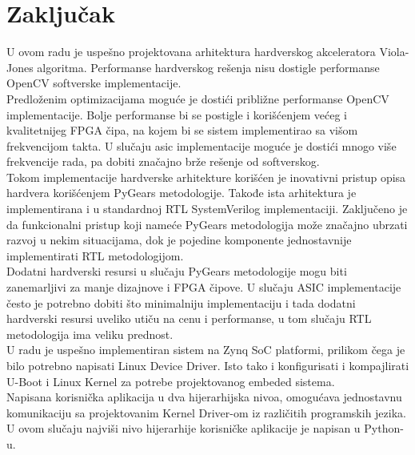 \section{Zaključak}

U ovom radu je uspešno projektovana arhitektura hardverskog akceleratora
Viola-Jones algoritma.
Performanse hardverskog rešenja nisu dostigle performanse OpenCV softverske
implementacije. \\

Predloženim optimizacijama moguće je dostići približne performanse OpenCV
implementacije.
Bolje performanse bi se postigle i korišćenjem većeg i kvalitetnijeg FPGA čipa,
na kojem bi se sistem implementirao sa višom frekvencijom takta.
U slučaju \gls{asic} implementacije moguće je dostići mnogo više
frekvencije rada, pa dobiti značajno brže rešenje od softverskog. \\

Tokom implementacije hardverske arhitekture korišćen je inovativni pristup opisa
hardvera korišćenjem PyGears metodologije.
Takođe ista arhitektura je implementirana i u standardnoj RTL SystemVerilog
implementaciji.
Zaključeno je da funkcionalni pristup koji nameće PyGears metodologija može
značajno ubrzati razvoj u nekim situacijama, dok je pojedine komponente
jednostavnije implementirati RTL metodologijom. \\
Dodatni hardverski resursi u slučaju PyGears metodologije mogu biti zanemarljivi
za manje dizajnove i FPGA čipove.
U slučaju ASIC implementacije često je potrebno dobiti što minimalniju implementaciju i
tada dodatni hardverski resursi uveliko utiču na cenu i performanse, u tom
slučaju RTL metodologija ima veliku prednost. \\

U radu je uspešno implementiran sistem na Zynq SoC platformi, prilikom
čega je bilo potrebno napisati Linux Device Driver.
Isto tako i konfigurisati i kompajlirati U-Boot i Linux Kernel za potrebe
projektovanog embeded sistema. \\
Napisana korisnička aplikacija u dva hijerarhijska nivoa, omogućava jednostavnu
komunikaciju sa projektovanim Kernel Driver-om iz različitih programskih jezika.
U ovom slučaju najviši nivo hijerarhije korisničke aplikacije je napisan u
Python-u. \\
